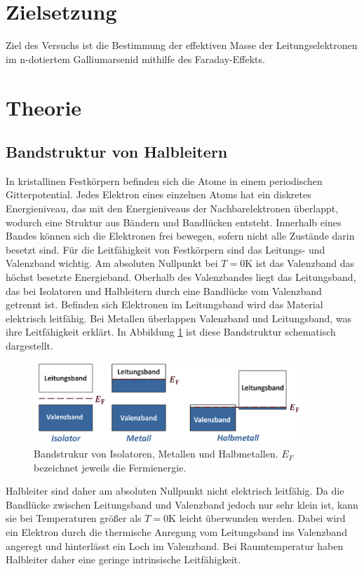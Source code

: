 



\maketitle
\section{Zielsetzung}
Ziel des Versuchs ist die Bestimmung der effektiven Masse der Leitungselektronen im n-dotiertem Galliumarsenid 
mithilfe des Faraday-Effekts.

\section{Theorie}
\subsection{Bandstruktur von Halbleitern}
In kristallinen Festkörpern befinden sich die Atome in einem periodischen Gitterpotential. Jedes Elektron eines einzelnen
Atoms hat ein diskretes Energieniveau, das mit den Energieniveaus der Nachbarelektronen überlappt, wodurch eine
Struktur aus Bändern und Bandlücken entsteht. Innerhalb eines Bandes können sich die Elektronen frei bewegen, sofern nicht alle 
Zustände darin besetzt sind. 
Für die Leitfähigkeit von Festkörpern sind das Leitungs- und Valenzband wichtig.
Am absoluten Nullpunkt bei $T = 0 \si{\kelvin}$ ist das Valenzband das höchst besetzte Energieband. 
Oberhalb des Valenzbandes liegt das Leitungsband, das bei Isolatoren und Halbleitern durch eine Bandlücke vom 
Valenzband getrennt ist. Befinden sich Elektronen im Leitungsband wird das Material elektrisch leitfähig.
Bei Metallen überlappen Valenzband und Leitungsband, was ihre Leitfähigkeit erklärt.
In Abbildung \ref{fig:tfig1} ist diese Bandstruktur schematisch dargestellt.
\FloatBarrier
\begin{figure}[h]
    \centering
    \includegraphics[width=0.9\textwidth]{band.png}
    \caption{Bandstrukur von Isolatoren, Metallen und Halbmetallen. $E_F$ bezeichnet jeweils die Fermienergie.}
    \label{fig:tfig1}
\end{figure}
\FloatBarrier
\noindent
Halbleiter sind daher am absoluten Nullpunkt nicht elektrisch leitfähig. Da die Bandlücke zwischen Leitungsband und 
Valenzband jedoch nur sehr klein ist, kann sie bei Temperaturen größer als $T = 0 \si{\kelvin}$ leicht überwunden werden. Dabei wird ein 
Elektron durch die thermische Anregung vom Leitungsband ins Valenzband angeregt und hinterlässt ein Loch im Valenzband. 
Bei Raumtemperatur haben Halbleiter daher eine geringe intrinsische Leitfähigkeit. 

